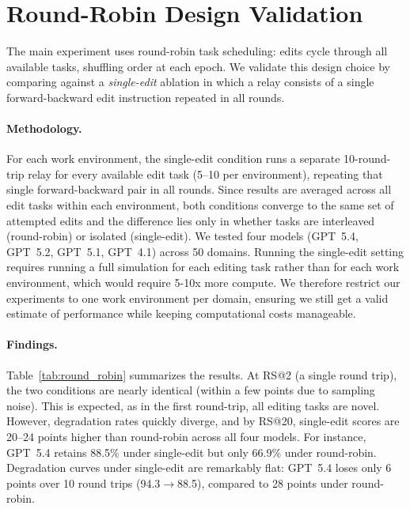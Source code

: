 \documentclass{article} %
\begin{document}
\section{Round-Robin Design Validation} \label{app:round_robin}

\begin{table}
\vspace{-4\intextsep}

\caption{Round-robin (\iconroundrobin) vs.\ single-edit (\iconsingleedit) degradation for four models. Single-edit repeats one task for all 10 round trips; round-robin cycles through 5--10 tasks. Task diversity drives the majority of observed degradation.}
\label{tab:round_robin}
\vspace{-1\intextsep}
\end{table}

The main experiment uses round-robin task scheduling: edits cycle through all available tasks, shuffling order at each epoch. We validate this design choice by comparing against a \textit{single-edit} ablation in which a relay consists of a single forward-backward edit instruction repeated in all rounds.

\paragraph{Methodology.} For each work environment, the single-edit condition runs a separate 10-round-trip relay for every available edit task (5--10 per environment), repeating that single forward-backward pair in all rounds. Since results are averaged across all edit tasks within each environment, both conditions converge to the same set of attempted edits and the difference lies only in whether tasks are interleaved (round-robin) or isolated (single-edit). We tested four models (GPT~5.4, GPT~5.2, GPT~5.1, GPT~4.1) across 50 domains. Running the single-edit setting requires running a full simulation for each editing task rather than for each work environment, which would require 5-10x more compute. We therefore restrict our experiments to one work environment per domain, ensuring we still get a valid estimate of performance while keeping computational costs manageable.

\paragraph{Findings.} Table~\ref{tab:round_robin} summarizes the results. At RS@2 (a single round trip), the two conditions are nearly identical (within a few points due to sampling noise). This is expected, as in the first round-trip, all editing tasks are novel. However, degradation rates quickly diverge, and by RS@20, single-edit scores are 20--24 points higher than round-robin across all four models. For instance, GPT~5.4 retains 88.5\% under single-edit but only 66.9\% under round-robin. Degradation curves under single-edit are remarkably flat: GPT~5.4 loses only 6 points over 10 round trips (94.3$\to$88.5), compared to 28 points under round-robin.
\end{document}
